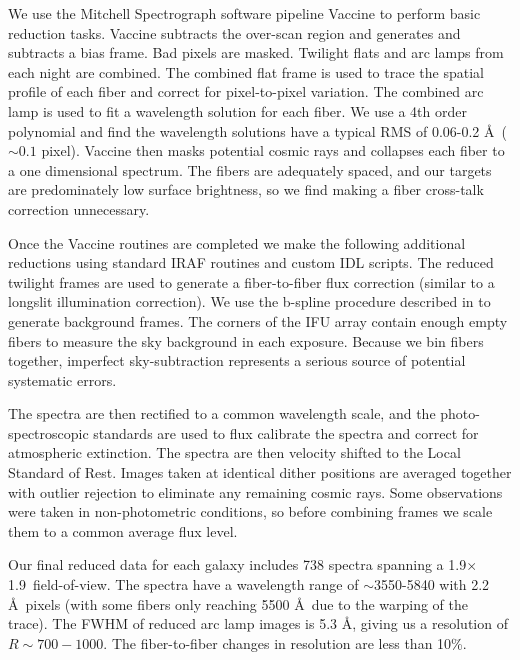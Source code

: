 \documentclass{emulateapj}
\begin{document}

We use the Mitchell Spectrograph software pipeline Vaccine \citep{Adams2011} to perform basic reduction tasks.  Vaccine subtracts the over-scan region and generates and subtracts a bias frame.  Bad pixels are masked.  Twilight flats and arc lamps from each night are combined.  The combined flat frame is used to trace the spatial profile of each fiber and correct for pixel-to-pixel variation.  The combined arc lamp is used to fit a wavelength solution for each fiber.  We use a 4th order polynomial and find the wavelength solutions have a typical RMS of 0.06-0.2 \AA\ ($\sim0.1$ pixel).  Vaccine then masks potential cosmic rays and collapses each fiber to a one dimensional spectrum.  The fibers are adequately spaced, and our targets are predominately low surface brightness, so we find making a fiber cross-talk correction unnecessary.

Once the Vaccine routines are completed we make the following additional reductions using standard IRAF routines and custom IDL scripts.  The reduced twilight frames are used to generate a fiber-to-fiber flux correction (similar to a longslit illumination correction).  We use the b-spline procedure described in \citet{Kelson03} to generate background frames.  The corners of the IFU array contain enough empty fibers to measure the sky background in each exposure.  Because we bin fibers together, imperfect sky-subtraction represents a serious source of potential systematic errors.  

The spectra are then rectified to a common wavelength scale, and the photo-spectroscopic standards are used to flux calibrate the spectra and correct for atmospheric extinction.  The spectra are then velocity shifted to the Local Standard of Rest.  Images taken at identical dither positions are averaged together with outlier rejection to eliminate any remaining cosmic rays.  Some observations were taken in non-photometric conditions, so before combining frames we scale them to a common average flux level.  

Our final reduced data for each galaxy includes 738 spectra spanning a 1.9\arcmin$\times$1.9\arcmin\ field-of-view.  The spectra have a wavelength range of $\sim$3550-5840 with 2.2 \AA\ pixels (with some fibers only reaching 5500 \AA\ due to the warping of the trace).  The FWHM of reduced arc lamp images is 5.3 \AA, giving us a resolution of $R\sim700-1000$.  The fiber-to-fiber changes in resolution are less than 10\%.  
\end{document}
